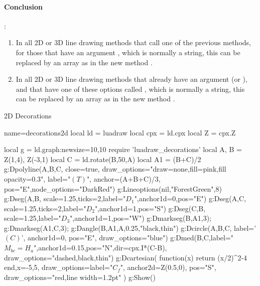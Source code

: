 \paragraph{Conclusion}:
\begin{enumerate}
    \item In all 2D or 3D line drawing methods that call one of the previous methods, for those that have an argument , which is normally a string, this can be replaced by an array  as in the new method .

    \item In all 2D or 3D line drawing methods that already have an argument  (or ), and that have one of these options called , which is normally a string, this can be replaced by an array  as in the new method .
\end{enumerate}

\begin{demo}{2D Decorations}
\begin{luadraw}{name=decorations2d}
local ld = luadraw
local cpx = ld.cpx
local Z = cpx.Z

local g = ld.graph:new{size={10,10}}
require 'luadraw_decorations'
local A, B = Z(1,4), Z(-3,1)
local C = ld.rotate(B,50,A)
local A1 = (B+C)/2
g:Dpolyline({A,B,C}, {close=true, draw_options="draw=none,fill=pink,fill opacity=0.3", 
    label="$(T)$", anchor=(A+B+C)/3, pos="E",node_options="DarkRed"})
g:Lineoptions(nil,"ForestGreen",8)
g:Dseg({A,B}, {scale=1.25,ticks=2,label="$D_1$",anchor1d=0,pos="E"})
g:Dseg({A,C}, {scale=1.25,ticks=2,label="$D_2$",anchor1d=1,pos="S"})
g:Dseg({C,B}, {scale=1.25,label="$D_3$",anchor1d=1,pos="W"})
g:Dmarkseg(B,A1,3); g:Dmarkseg(A1,C,3); g:Dangle(B,A1,A,0.25,"black,thin")
g:Dcircle({A,B,C}, {label='$(C)$', anchor1d=0, pos="E", draw_options="blue"})
g:Dmed(B,C,{label="$M_{bc}=H_a$",anchor1d=0.15,pos="N",dir=cpx.I*(C-B), draw_options="dashed,black,thin"})
g:Dcartesian( function(x) return (x/2)^2-4 end,{x={-5,5},
    draw_options={label="$C_f$", anchor2d=Z(0.5,0), pos="S", draw_options="red,line width=1.2pt"} })
g:Show()
\end{luadraw}
\end{demo}


